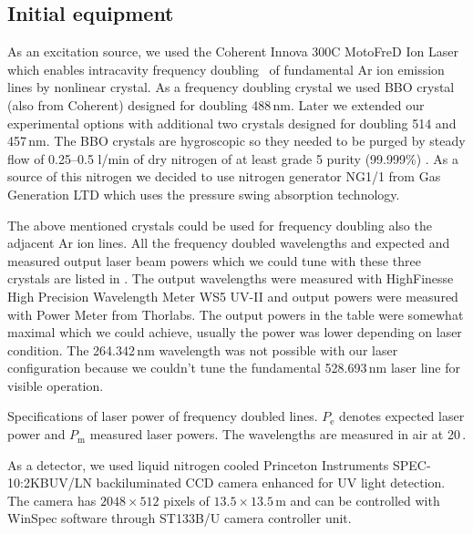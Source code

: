 \subsection{Initial equipment}
\label{initial_equipment}

As an excitation source, we used the Coherent Innova 300C
MotoFreD\texttrademark{} Ion Laser which enables intracavity frequency
doubling~\parencite{Asher1993b} of fundamental Ar ion emission lines by
nonlinear crystal. As a frequency doubling crystal we used BBO crystal (also
from Coherent) designed for doubling 488\,nm. Later we extended our
experimental options with additional two crystals designed for doubling 514 and
457\,nm. The BBO crystals are hygroscopic so they needed to be purged by steady
flow of 0.25--0.5 l/min of dry nitrogen of at least grade 5 purity (99.999\%)
\parencite{Innova300MotoFreDManual}.
As a source of this nitrogen we decided to use
nitrogen generator NG1/1 from Gas Generation LTD which uses the pressure
swing absorption technology.

The above mentioned crystals could be used for
frequency doubling also the adjacent Ar ion lines. All the frequency doubled
wavelengths and expected and measured output laser beam powers which we could
tune with these three crystals are listed in
. The output wavelengths were
measured with HighFinesse High Precision Wavelength Meter WS5 UV-II and output
powers were measured with Power Meter from Thorlabs. The output powers in the
table were somewhat maximal which we could achieve, usually the power was
lower depending on laser condition. The 264.342\,nm wavelength was not possible
with our laser configuration because we couldn't tune the fundamental
528.693\,nm laser line for visible operation.

\begin{table}
	\centering
	
	\caption{Specifications of laser power of frequency doubled lines.
	$P_\text{e}$ denotes expected laser power and $P_\text{m}$ measured
	laser powers. The wavelengths are measured in air at 20\,\textcelsius{}.}
	\label{\tablabel{initial_equipment:laser_power_spec}}
\end{table}

As a detector, we used liquid nitrogen cooled Princeton Instruments
SPEC-10:2KBUV/LN backiluminated CCD camera enhanced for UV light detection.
The camera has $2048\times512$ pixels of $13.5\times13.5$\,m and can
be controlled with WinSpec software through ST133B/U camera controller unit.
